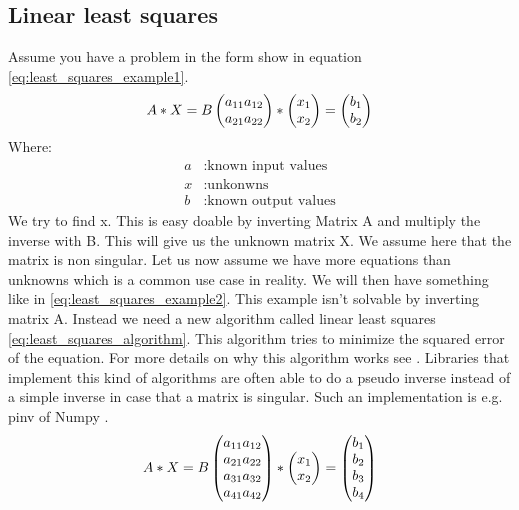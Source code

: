 \documentclass[11pt,a4paper,titlepage,oneside]{report}
\begin{document}
\subsection{Linear least squares}
Assume you have a problem in the form show in equation \ref{eq:least_squares_example1}.
\begin{equation}\label{eq:least_squares_example1}
  A*X=B \\ 
  \begin{pmatrix}
    a_{11} a_{12} \\
    a_{21} a_{22}
  \end{pmatrix}*
  \begin{pmatrix}
    x_1 \\
    x_2
  \end{pmatrix}=
  \begin{pmatrix}
    b_1 \\
    b_2
  \end{pmatrix}
\end{equation}
Where:
\begin{align*}
  a		  &: \text{known input values}\\
  x	  	&: \text{unkonwns}\\
  b		  &: \text{known output values}
\end{align*}
We try to find x. This is easy doable by inverting Matrix A and multiply the inverse with B. This will give us the unknown matrix X. We assume here that the matrix is non singular. Let us now assume we have more equations than unknowns which is a common use case in reality. We will then have something like in \ref{eq:least_squares_example2}. This example isn't solvable by inverting matrix A. Instead we need a new algorithm called linear least squares \ref{eq:least_squares_algorithm}. This algorithm tries to minimize the squared error of the equation. For more details on why this algorithm works see \cite{Monson}. Libraries that implement this kind of algorithms are often able to do a pseudo inverse instead of a simple inverse in case that a matrix is singular. Such an implementation is e.g. pinv of Numpy \cite{pinv}.
\begin{equation}\label{eq:least_squares_example2}
  A*X=B \\ 
  \begin{pmatrix}
    a_{11} a_{12} \\
    a_{21} a_{22} \\
    a_{31} a_{32} \\
    a_{41} a_{42}
  \end{pmatrix}*
  \begin{pmatrix}
    x_1 \\
    x_2
  \end{pmatrix}=
  \begin{pmatrix}
    b_1 \\
    b_2 \\
    b_3 \\
    b_4
  \end{pmatrix}
\end{equation}
\end{document}
